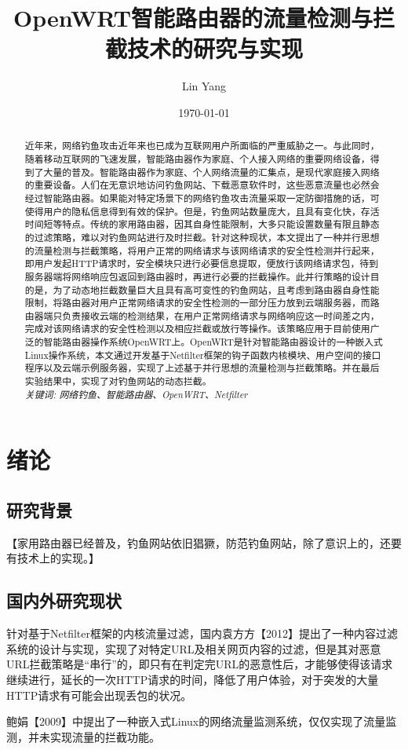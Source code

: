 \documentclass[a4paper,onecolumn,UTF8]{ctexart}
\title{OpenWRT智能路由器的流量检测与拦截技术的研究与实现}
\author{Lin Yang}
\date{\today}
\begin{document}
\tableofcontents
\maketitle
\begin{abstract}
  近年来，网络钓鱼攻击近年来也已成为互联网用户所面临的严重威胁之一。与此同时，随着移动互联网的飞速发展，智能路由器作为家庭、个人接入网络的重要网络设备，得到了大量的普及。智能路由器作为家庭、个人网络流量的汇集点，是现代家庭接入网络的重要设备。人们在无意识地访问钓鱼网站、下载恶意软件时，这些恶意流量也必然会经过智能路由器。如果能对特定场景下的网络钓鱼攻击流量采取一定防御措施的话，可使得用户的隐私信息得到有效的保护。但是，钓鱼网站数量庞大，且具有变化快，存活时间短等特点。传统的家用路由器，因其自身性能限制，大多只能设置数量有限且静态的过滤策略，难以对钓鱼网站进行及时拦截。针对这种现状，本文提出了一种并行思想的流量检测与拦截策略，将用户正常的网络请求与该网络请求的安全性检测并行起来，即用户发起HTTP请求时，安全模块只进行必要信息提取，便放行该网络请求包，待到服务器端将网络响应包返回到路由器时，再进行必要的拦截操作。此并行策略的设计目的是，为了动态地拦截数量巨大且具有高可变性的钓鱼网站，且考虑到路由器自身性能限制，将路由器对用户正常网络请求的安全性检测的一部分压力放到云端服务器，而路由器端只负责接收云端的检测结果，在用户正常网络请求与网络响应这一时间差之内，完成对该网络请求的安全性检测以及相应拦截或放行等操作。该策略应用于目前使用广泛的智能路由器操作系统OpenWRT上。OpenWRT是针对智能路由器设计的一种嵌入式Linux操作系统，本文通过开发基于Netfilter框架的钩子函数内核模块、用户空间的接口程序以及云端示例服务器，实现了上述基于并行思想的流量检测与拦截策略。并在最后实验结果中，实现了对钓鱼网站的动态拦截。%
  \\[0.5cm]
  \emph{关键词: 网络钓鱼、智能路由器、OpenWRT、Netfilter}
\end{abstract}

\section{绪论}
\subsection{研究背景}
【家用路由器已经普及，钓鱼网站依旧猖獗，防范钓鱼网站，除了意识上的，还要有技术上的实现。】
\subsection{国内外研究现状}
针对基于Netfilter框架的内核流量过滤，国内袁方方【2012】提出了一种内容过滤系统的设计与实现，实现了对特定URL及相关网页内容的过滤，但是其对恶意URL拦截策略是“串行”的，即只有在判定完URL的恶意性后，才能够使得该请求继续进行，延长的一次HTTP请求的时间，降低了用户体验，对于突发的大量HTTP请求有可能会出现丢包的状况。
\par  鲍娟【2009】中提出了一种嵌入式Linux的网络流量监测系统，仅仅实现了流量监测，并未实现流量的拦截功能。
\end{document}
